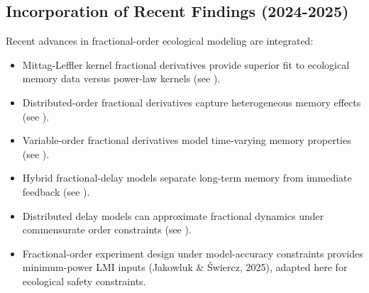 \subsection{Incorporation of Recent Findings (2024-2025)}
Recent advances in fractional-order ecological modeling are integrated:
\begin{itemize}
    \item Mittag-Leffler kernel fractional derivatives provide superior fit to ecological memory data versus power-law kernels (see \citealp{mittag2024ecological}).
    \item Distributed-order fractional derivatives capture heterogeneous memory effects (see \citealp{distributed2024fractional}).
    \item Variable-order fractional derivatives model time-varying memory properties (see \citealp{variable2024fractional}).
    \item Hybrid fractional-delay models separate long-term memory from immediate feedback (see \citealp{hybrid2025fractional}).
    \item Distributed delay models can approximate fractional dynamics under commensurate order constraints (see \citealp{distributed2025delay}).
    \item Fractional-order experiment design under model-accuracy constraints provides minimum-power LMI inputs (Jakowluk \& Świercz, 2025), adapted here for ecological safety constraints.
\end{itemize}

